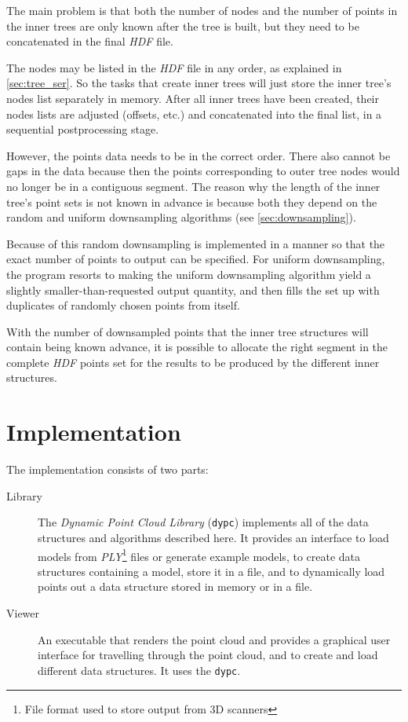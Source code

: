 \documentclass[a4paper,10pt,abstracton,notitlepage]{scrreprt}
\begin{document}
The main problem is that both the number of nodes and the number of points in the inner trees are only known after the tree is built, but they need to be concatenated in the final \emph{HDF} file.

The nodes may be listed in the \emph{HDF} file in any order, as explained in \ref{sec:tree_ser}. So the tasks that create inner trees will just store the inner tree's nodes list separately in memory. After all inner trees have been created, their nodes lists are adjusted (offsets, etc.) and concatenated into the final list, in a sequential postprocessing stage.

However, the points data needs to be in the correct order. There also cannot be gaps in the data because then the points corresponding to outer tree nodes would no longer be in a contiguous segment. The reason why the length of the inner tree's point sets is not known in advance is because both they depend on the random and uniform downsampling algorithms (see \ref{sec:downsampling}).

Because of this random downsampling is implemented in a manner so that the exact number of points to output can be specified. For uniform downsampling, the program resorts to making the uniform downsampling algorithm yield a slightly smaller-than-requested output quantity, and then fills the set up with duplicates of randomly chosen points from itself.

With the number of downsampled points that the inner tree structures will contain being known advance, it is possible to allocate the right segment in the complete \emph{HDF} points set for the results to be produced by the different inner structures.


\chapter{Implementation}
The implementation consists of two parts:
\begin{description}
\item[Library] The \emph{Dynamic Point Cloud Library} (\texttt{dypc}) implements all of the data structures and algorithms described here. It provides an interface to load models from \emph{PLY}\footnote{File format used to store output from 3D scanners} files or generate example models, to create data structures containing a model, store it in a file, and to dynamically load points out a data structure stored in memory or in a file.
\item[Viewer] An executable that renders the point cloud and provides a graphical user interface for travelling through the point cloud, and to create and load different data structures. It uses the \texttt{dypc}.
\end{description}
\end{document}
